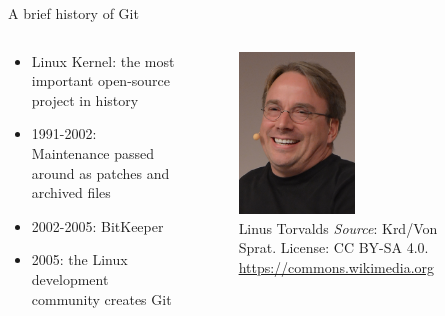 \documentclass[handout]{beamer}
\begin{document}
\begin{frame}{A brief history of Git}
\begin{columns}
  \begin{column}{0.5\textwidth}

    \begin{itemize}
      \item Linux Kernel: the most important open-source project in history
      \item 1991-2002: Maintenance passed around as patches and archived files
      \item 2002-2005: BitKeeper
      \item 2005: the Linux development community creates Git
    \end{itemize}

  \end{column}
  \begin{column}{0.5\textwidth}
  
  \begin{figure}
	  \includegraphics[width=0.5\textwidth]{figures/linus.jpg}
	  \caption{Linus Torvalds \textit{Source}: Krd/Von Sprat. License: CC BY-SA 4.0. \href{https://commons.wikimedia.org/wiki/File:LinuxCon_Europe_Linus_Torvalds_03.jpg}{https://commons.wikimedia.org}}
  \end{figure}  
    
  \end{column}
\end{columns}

\end{frame}
\end{document}
